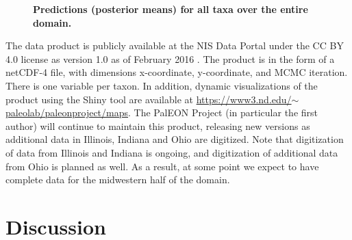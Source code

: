 \documentclass[10pt,letterpaper]{article}
\begin{document}
\begin{figure}

\caption{{\bf Predictions (posterior means) for all taxa over the entire domain.}}
\label{fig:all_predictions}

\end{figure}


The data product is publicly available at the NIS
Data Portal under
the CC BY 4.0 license as version 1.0 as of February 2016 \cite{paci:etal:data:2016}.
The product is in the form of a netCDF-4 file, with dimensions x-coordinate,
y-coordinate, and MCMC iteration. There is one variable per taxon.
In addition, dynamic visualizations of the product using the Shiny
tool are available at \href{https://www3.nd.edu/~paleolab/paleonproject/maps}{https://www3.nd.edu/$\sim$paleolab/paleonproject/maps}.
The PalEON Project (in particular the first author) will continue
to maintain this product, releasing new versions as additional data
in Illinois, Indiana and Ohio are digitized. Note that digitization
of data from Illinois and Indiana is ongoing, and digitization of
additional data from Ohio is planned as well. As a result, at some
point we expect to have complete data for the midwestern half of the
domain. 


\section*{Discussion}\label{sec:Discussion}
\end{document}
